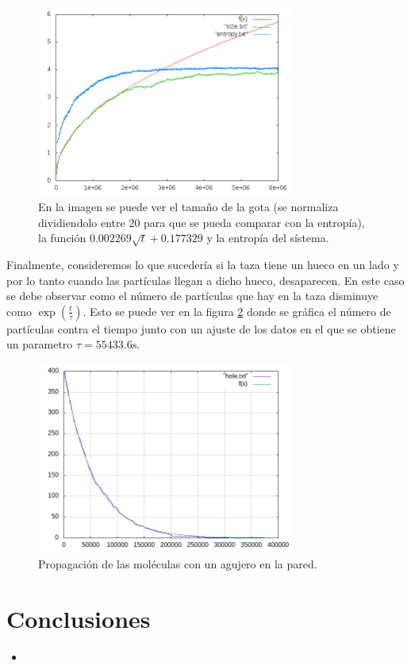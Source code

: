 \documentclass[12pt,twocolumn]{article}
\begin{document}
\begin{figure}
    \centering
    \includegraphics[width=0.75\textwidth]{figs/size.png}
    \caption{En la imagen se puede ver el tamaño de la gota (se normaliza dividiendolo entre 20 para que se pueda comparar con la entropía), la función $0.002269 \sqrt{t} + 0.177329$ y la entropía del sístema.}
    \label{fig:size}
\end{figure}

Finalmente, consideremos lo que sucedería si la taza tiene un hueco en un lado y por lo tanto cuando las partículas llegan a dicho hueco, desaparecen. En este caso se debe observar como el número de partículas que hay en la taza disminuye como $\exp{(\frac{t}{\tau})}$. Esto se puede ver en la figura \ref{fig:hole} donde se gráfica el número de partículas contra el tiempo junto con un ajuste de los datos en el que se obtiene un parametro $\tau = 55433.6\mathrm{s}$.
\begin{figure}
    \centering
    \includegraphics[width=0.75\textwidth]{figs/hole.png}
    \caption{Propagación de las moléculas con un agujero en la pared.}
    \label{fig:hole}
\end{figure}



\section{Conclusiones}
\begin{itemize}
    \item 
\end{itemize}
\end{document}

